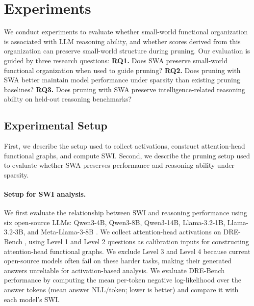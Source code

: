 \section{Experiments}







We conduct experiments to evaluate whether small-world functional organization is associated with LLM reasoning ability, and whether scores derived from this organization can preserve small-world structure during pruning. Our evaluation is guided by three research questions: \textbf{RQ1.} Does SWA preserve small-world functional organization when used to guide pruning? \textbf{RQ2.} Does pruning with SWA better maintain model performance under sparsity than existing pruning baselines? \textbf{RQ3.} Does pruning with SWA preserve intelligence-related reasoning ability on held-out reasoning benchmarks?

\vspace{-0.2cm}
\subsection{Experimental Setup}
\label{sec:swa_exp_setup}

First, we describe the setup used to collect activations, construct attention-head functional graphs, and compute SWI. Second, we describe the pruning setup used to evaluate whether SWA preserves performance and reasoning ability under sparsity.


\paragraph{Setup for SWI analysis.}
We first evaluate the relationship between SWI and reasoning performance using six open-source LLMs: Qwen3-4B, Qwen3-8B, Qwen3-14B, Llama-3.2-1B, Llama-3.2-3B, and Meta-Llama-3-8B \cite{yang2025qwen3, grattafiori2024llama}. We collect attention-head activations on DRE-Bench \cite{yang2025truly}, using Level 1 and Level 2 questions as calibration inputs for constructing attention-head functional graphs. We exclude Level 3 and Level 4 because current open-source models often fail on these harder tasks, making their generated answers unreliable for activation-based analysis. We evaluate DRE-Bench performance by computing the mean per-token negative log-likelihood over the answer tokens (mean answer NLL/token; lower is better) and compare it with each model's SWI.

